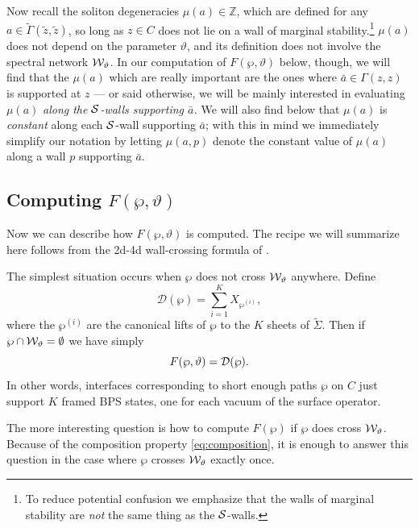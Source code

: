\documentclass[11pt,a4paper]{article}
\def\Z{{\mathbb{Z}}}
\def\CD {{\cal D}}
\def\wnet {{\cal W}}
\def\cS {{\cal S}}
\def\tz{{\tilde z}}
\newcommand{\tGamma}{\tilde\Gamma}
\newcommand{\ti}[1]{\textit{#1}}
\def\CD {{\cal D}}
\def\wnet {{\cal W}}
\newcommand\cD{{\mathcal D}}
\begin{document}
Now recall the soliton degeneracies $\mu(a) \in \Z$, which are
defined for any $a \in \tGamma(\tz,\tz)$, so long as
$z \in C$ does not lie on a wall of marginal stability.\footnote{To reduce potential confusion we
emphasize that the walls of marginal stability are \ti{not} the same thing as the $\cS$-walls.}
$\mu(a)$ does not depend on the parameter $\vartheta$, and its definition does not involve the spectral network $\wnet_{\vartheta}$.
In our computation of $F(\wp, \vartheta)$ below, though, we will find that the $\mu(a)$
which are really important are the ones where $\bar a \in \Gamma(z,z)$ is supported at $z$ ---
or said otherwise, we will be mainly interested in evaluating $\mu(a)$ \ti{along the $\cS$-walls supporting $\bar a$.}
We will also find below that $\mu(a)$ is \ti{constant} along each $\cS$-wall supporting $\bar a$;
with this in mind we immediately simplify our notation by letting $\mu(a,p)$ denote the constant value of $\mu(a)$ along
a wall $p$ supporting $\bar a$.


\subsection{Computing $F(\wp,\vartheta)$}\label{subsec:Compute-FP}

Now we can describe how $F(\wp,\vartheta)$ is computed.
The recipe we will summarize here follows from the 2d-4d wall-crossing formula
of \cite{Gaiotto:2011tf}.

The simplest situation occurs when $\wp$ does not cross $\wnet_\vartheta$ anywhere.  Define
\begin{equation}
 \cD(\wp) = \sum_{i=1}^K X_{\wp^{(i)}},
\end{equation}
where the $\wp^{(i)}$ are the canonical lifts of $\wp$ to the $K$ sheets of $\tilde\Sigma$.
Then if $\wp \cap \wnet_\vartheta = \emptyset$ we have simply
\begin{equation}\label{eq:TrivPar}
F(\wp,\vartheta) = \CD(\wp).
\end{equation}
In other words, interfaces corresponding to short enough paths $\wp$ on $C$
just support $K$ framed BPS states, one for each vacuum of the surface operator.

The more interesting question is how to compute $F(\wp)$ if $\wp$ does cross $\wnet_\vartheta$.
Because of the composition property \eqref{eq:composition}, it is enough to
answer this question in the case where $\wp$ crosses $\wnet_\vartheta$ exactly once.
\end{document}
